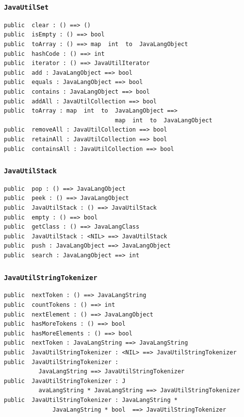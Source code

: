 \documentclass[\pformat,12pt]{article}
\begin{document}
\subsubsection{\texttt{JavaUtilSet}}
\begin{small}
\begin{verbatim}
public  clear : () ==> ()
public  isEmpty : () ==> bool
public  toArray : () ==> map  int  to  JavaLangObject
public  hashCode : () ==> int
public  iterator : () ==> JavaUtilIterator
public  add : JavaLangObject ==> bool
public  equals : JavaLangObject ==> bool
public  contains : JavaLangObject ==> bool
public  addAll : JavaUtilCollection ==> bool
public  toArray : map  int  to  JavaLangObject ==> 
                                map  int  to  JavaLangObject
public  removeAll : JavaUtilCollection ==> bool
public  retainAll : JavaUtilCollection ==> bool
public  containsAll : JavaUtilCollection ==> bool
\end{verbatim}
\end{small}

\subsubsection{\texttt{JavaUtilStack}}
\begin{small}
\begin{verbatim}
public  pop : () ==> JavaLangObject
public  peek : () ==> JavaLangObject
public  JavaUtilStack : () ==> JavaUtilStack
public  empty : () ==> bool
public  getClass : () ==> JavaLangClass
public  JavaUtilStack : <NIL> ==> JavaUtilStack
public  push : JavaLangObject ==> JavaLangObject
public  search : JavaLangObject ==> int
\end{verbatim}
\end{small}

\subsubsection{\texttt{JavaUtilStringTokenizer}}
\begin{small}
\begin{verbatim}
public  nextToken : () ==> JavaLangString
public  countTokens : () ==> int
public  nextElement : () ==> JavaLangObject
public  hasMoreTokens : () ==> bool
public  hasMoreElements : () ==> bool
public  nextToken : JavaLangString ==> JavaLangString
public  JavaUtilStringTokenizer : <NIL> ==> JavaUtilStringTokenizer
public  JavaUtilStringTokenizer : 
          JavaLangString ==> JavaUtilStringTokenizer
public  JavaUtilStringTokenizer : J
          avaLangString * JavaLangString ==> JavaUtilStringTokenizer
public  JavaUtilStringTokenizer : JavaLangString * 
              JavaLangString * bool  ==> JavaUtilStringTokenizer
\end{verbatim}
\end{small}
\end{document}

